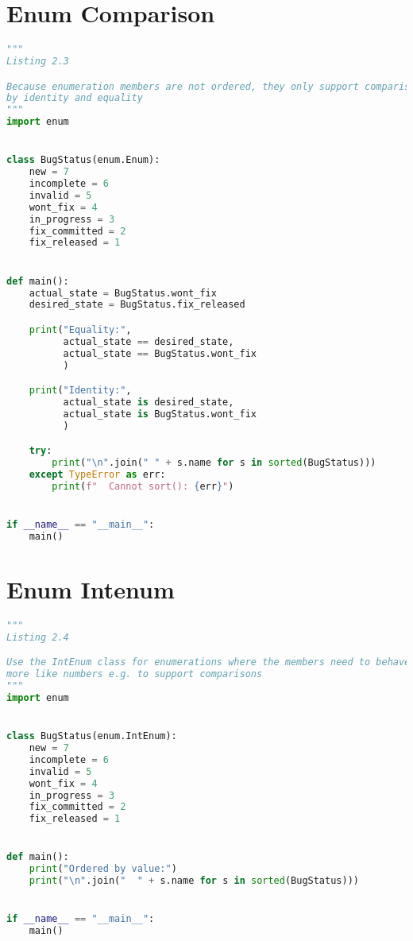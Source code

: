 \documentclass[a4paper,landscape]{report}
\begin{document}
\section{Enum Comparison}
\begin{lstlisting}[language=Python]
"""
Listing 2.3

Because enumeration members are not ordered, they only support comparison
by identity and equality
"""
import enum


class BugStatus(enum.Enum):
    new = 7
    incomplete = 6
    invalid = 5
    wont_fix = 4
    in_progress = 3
    fix_committed = 2
    fix_released = 1


def main():
    actual_state = BugStatus.wont_fix
    desired_state = BugStatus.fix_released

    print("Equality:",
          actual_state == desired_state,
          actual_state == BugStatus.wont_fix
          )

    print("Identity:",
          actual_state is desired_state,
          actual_state is BugStatus.wont_fix
          )

    try:
        print("\n".join(" " + s.name for s in sorted(BugStatus)))
    except TypeError as err:
        print(f"  Cannot sort(): {err}")


if __name__ == "__main__":
    main()

\end{lstlisting}
\section{Enum Intenum}
\begin{lstlisting}[language=Python]
"""
Listing 2.4

Use the IntEnum class for enumerations where the members need to behave
more like numbers e.g. to support comparisons
"""
import enum


class BugStatus(enum.IntEnum):
    new = 7
    incomplete = 6
    invalid = 5
    wont_fix = 4
    in_progress = 3
    fix_committed = 2
    fix_released = 1


def main():
    print("Ordered by value:")
    print("\n".join("  " + s.name for s in sorted(BugStatus)))


if __name__ == "__main__":
    main()

\end{lstlisting}
\end{document}
